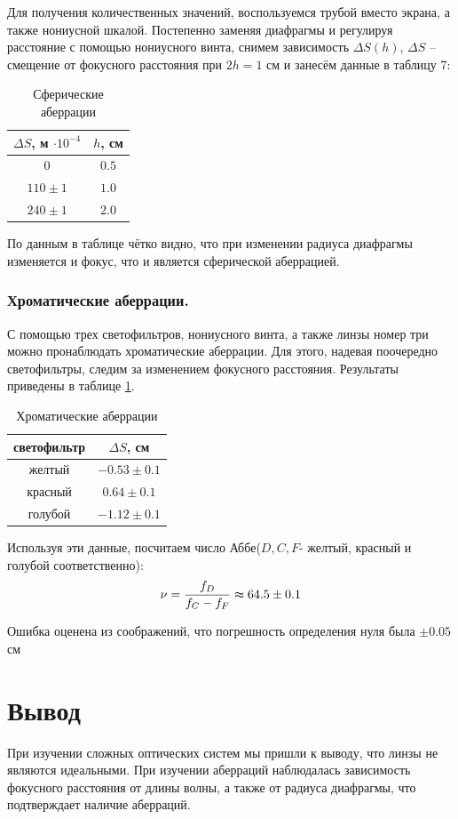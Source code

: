 \documentclass[a4paper,12pt]{article}
\begin{document}
	Для получения количественных значений, воспользуемся трубой вместо экрана, а также нониусной шкалой. Постепенно заменяя диафрагмы и регулируя расстояние с помощью нониусного винта, снимем зависимость $\Delta S(h)$, $\Delta S$ -- смещение от фокусного расстояния при $2h=1$ см и занесём данные в таблицу 7:
	
	\begin{table}[h] 
		\centering
		\begin{tabular}{|c|c|}
			\hline
			$\Delta S$, м $\cdot10^{-4}$ &$h$, см \\ \hline
			$0$         &$0.5$ \\ \hline
			$110 \pm 1$          & $1.0$ \\ \hline
			$240 \pm 1$      &   $2.0$ \\ \hline
		\end{tabular}
		\caption{Сферические аберрации}
	\end{table}
	По данным в таблице чётко видно, что при изменении радиуса диафрагмы изменяется и фокус, что и является сферической аберрацией.
	
\subsubsection*{Хроматические аберрации.} С помощью трех светофильтров, нониусного винта, а также линзы номер три можно пронаблюдать хроматические аберрации. Для этого, надевая поочередно светофильтры, следим за изменением фокусного расстояния. Результаты приведены в таблице \ref{tab:8}.
	
	\begin{table} [bhtp!]
		\centering
		\begin{tabular}{|c|c|} \hline
			светофильтр& $\Delta S$, см \\\hline 
			желтый & $-0.53 \pm 0.1$ \\\hline
			красный& $0.64\pm 0.1$\\\hline
			голубой &  $-1.12\pm 0.1$ \\ \hline
		\end{tabular}
		\caption{Хроматические аберрации}
		\label{tab:8}
	\end{table}

	Используя эти данные, посчитаем число Аббе($D,C,F$- желтый, красный и голубой соответственно):
	\begin{equation*}
	\nu = \frac{f_D}{f_C -f_F} \thickapprox 64.5 \pm 0.1
	\end{equation*}

Ошибка оценена из соображений, что погрешность определения нуля была $\pm 0.05$ см



\section*{Вывод}
При изучении сложных оптических систем мы пришли к выводу, что линзы не являются идеальными. При изучении аберраций наблюдалась зависимость фокусного расстояния от длины волны, а также от радиуса диафрагмы, что подтверждает наличие аберраций. 
\end{document}
